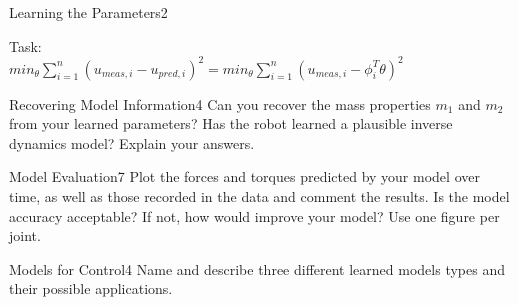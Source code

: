 \begin{questions}
\begin{question}{Learning the Parameters}{2}
\begin{answer}
	
	Task:\\
	$min_{\theta} \sum_{i=1}^n (u_{meas,i}-u_{pred,i})^2 =min_{\theta} \sum_{i=1}^n (u_{meas,i}-\phi^T_i \theta)^2 $
	
	
	\end{answer}

\end{question}



\begin{question}{Recovering Model Information}{4}
	Can you recover the mass properties $m_{1}$ and $m_{2}$ from your learned parameters? Has the robot learned a plausible inverse dynamics model? Explain your answers.
	
\begin{answer}\end{answer}
\end{question}



\begin{question}{Model Evaluation}{7}
Plot the forces and torques predicted by your model over time, as well as those recorded in the data and comment the results. Is the model accuracy acceptable? If not, how would improve your model? Use one figure per joint.

\begin{answer}\end{answer}

\end{question}



\begin{question}[bonus]{Models for Control}{4}
Name and describe three different learned models types and their possible applications.

\begin{answer}\end{answer}

\end{question}


\end{questions}
